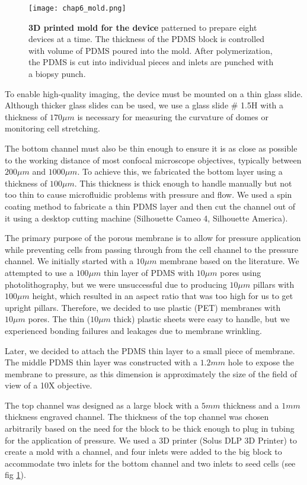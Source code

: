 \begin{figure}[b!]
	\centering
	\texttt{[image: chap6\_mold.png]}
	\caption{ \textbf{3D printed mold for the device} patterned to prepare eight devices at a time. The thickness of the PDMS block is controlled with volume of PDMS poured into the mold. After polymerization, the PDMS is cut into individual pieces and inlets are punched with a biopsy punch.	}\label{fig_6_1a}
\end{figure}

To enable high-quality imaging, the device must be mounted on a thin glass slide. Although thicker glass slides can be used, we use a glass slide \# 1.5H with a thickness of $170 \mu m$ is necessary for measuring the curvature of domes or monitoring cell stretching.  

The bottom channel must also be thin enough to ensure it is as close as possible to the working distance of most confocal microscope objectives, typically between $200\mu m$ and $1000 \mu m$. To achieve this, we fabricated the bottom layer using a thickness of $100 \mu m$. This thickness is thick enough to handle manually but not too thin to cause microfluidic problems with pressure and flow. We used a spin coating method to fabricate a thin PDMS layer and then cut the channel out of it using a desktop cutting machine (Silhouette Cameo 4, Silhouette America).  

The primary purpose of the porous membrane is to allow for pressure application while preventing cells from passing through from the cell channel to the pressure channel. We initially started with a $10\mu m$ membrane based on the literature. We attempted to use a $100 \mu m$ thin layer of PDMS with $10\mu m$ pores using photolithography, but we were unsuccessful due to producing $10\mu m$ pillars with $100 \mu m$ height, which resulted in an aspect ratio that was too high for us to get upright pillars. Therefore, we decided to use plastic (PET) membranes with $10\mu m$ pores. The thin ($10\mu m$ thick) plastic sheets were easy to handle, but we experienced bonding failures and leakages due to membrane wrinkling.  

Later, we decided to attach the PDMS thin layer to a small piece of membrane. The middle PDMS thin layer was constructed with a $1.2 mm$ hole to expose the membrane to pressure, as this dimension is approximately the size of the field of view of a 10X objective.  

The top channel was designed as a large block with a $5mm$ thickness and a $1mm$ thickness engraved channel. The thickness of the top channel was chosen arbitrarily based on the need for the block to be thick enough to plug in tubing for the application of pressure. We used a 3D printer (Solus DLP 3D Printer) to create a mold with a channel, and four inlets were added to the big block to accommodate two inlets for the bottom channel and two inlets to seed cells (see fig \ref{fig_6_1a}).

